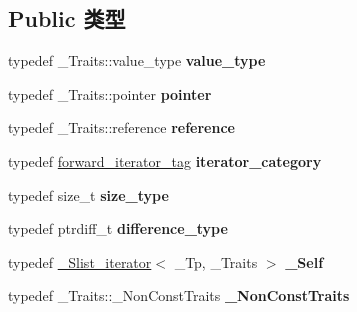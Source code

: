 \subsection*{Public 类型}
\begin{DoxyCompactItemize}
\item 
\mbox{\label{class___slist__iterator_a398c4be839f772b7d3c8ee5519eef67f}} 
typedef \+\_\+\+Traits\+::value\+\_\+type {\bfseries value\+\_\+type}
\item 
\mbox{\label{class___slist__iterator_a6ed86ec10051c4a4cb915263920aa5a3}} 
typedef \+\_\+\+Traits\+::pointer {\bfseries pointer}
\item 
\mbox{\label{class___slist__iterator_a2a2830d2475ff125ee36a4cf49f1cb43}} 
typedef \+\_\+\+Traits\+::reference {\bfseries reference}
\item 
\mbox{\label{class___slist__iterator_ab9258218e237b11669638b0586fdc0e8}} 
typedef \hyperlink{structforward__iterator__tag}{forward\+\_\+iterator\+\_\+tag} {\bfseries iterator\+\_\+category}
\item 
\mbox{\label{class___slist__iterator_a546b0ab283e5a3963de7ac55f0c7ad9d}} 
typedef size\+\_\+t {\bfseries size\+\_\+type}
\item 
\mbox{\label{class___slist__iterator_a9cbfa8df0ed4e5d300da762866e2e64b}} 
typedef ptrdiff\+\_\+t {\bfseries difference\+\_\+type}
\item 
\mbox{\label{class___slist__iterator_a057ac7f114607d1caae817ca2fef6484}} 
typedef \hyperlink{class___slist__iterator}{\+\_\+\+Slist\+\_\+iterator}$<$ \+\_\+\+Tp, \+\_\+\+Traits $>$ {\bfseries \+\_\+\+Self}
\item 
\mbox{\label{class___slist__iterator_a77e0e7a276d078b618dee0728da407a6}} 
typedef \+\_\+\+Traits\+::\+\_\+\+Non\+Const\+Traits {\bfseries \+\_\+\+Non\+Const\+Traits}
\item 
\mbox{\label{class___slist__iterator_a1c2ae752beb98f1409c6f970ba8fb499}} 

\end{DoxyCompactItemize}
